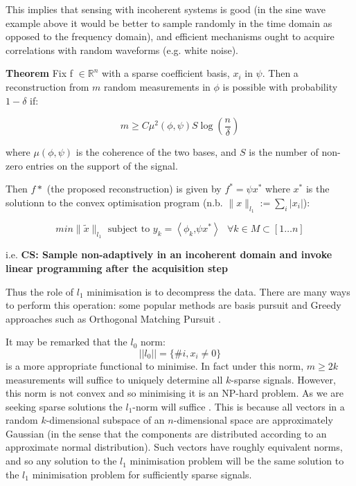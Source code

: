 \documentclass[12pt, a4paper]{article}
\newcommand{\vectornorm}[1]{\left|\left|#1\right|\right|}
\begin{document}
This implies that sensing with incoherent systems is good (in the sine wave example above it would be better to sample randomly in the time domain as opposed to the frequency domain), and efficient mechanisms ought to acquire correlations with random waveforms (e.g. white noise).

\textbf{Theorem} \cite{Candes2006}
Fix f \(\in \mathbb{R}^n\) with a sparse coefficient basis, \(x_{i}\) in \(\psi\). Then a reconstruction from \(m\) random measurements in \(\phi\) is possible with probability \(1 - \delta\) if: 

\begin{equation}
m \geq C \mu^2(\phi, \psi) S \log\left(\frac{n}{\delta}\right)
\end{equation}
\label{minsamples}

where \( \mu(\phi, \psi)\) is the coherence of the two bases, and \(S\) is the number of non-zero entries on the support of the signal.

Then \(f*\) (the proposed reconstruction) is given by \(f^* = \psi x^*\) where \(x^*\) is the solutionn to the convex optimisation program (n.b. \(\| x\|_{l_{1}} := \sum_{i} |x_{i}| \)):

\begin{equation}
min\|\tilde{x}\|_{l_{1}} \text{ subject to } y_{k} = \left\langle \phi_{k} \text{,} \psi x^* \right\rangle \text{   } \forall k \in M \subset [1 \ldots n]
\end{equation}
\label{program0}

i.e. \textbf{CS: Sample non-adaptively in an incoherent domain and invoke linear programming after the acquisition step}

Thus the role of \(l_{1}\) minimisation is to decompress the data. There are many ways to perform this operation: some popular methods are basis pursuit \cite{Chen1998} and Greedy approaches such as Orthogonal Matching Pursuit \cite{Tropp2007}. 

It may be remarked that the \(l_0\) norm:
%
\begin{equation}
\vectornorm{l_0} = \{\# i, x_i \neq 0\}
\end{equation}
%
is a more appropriate functional to minimise. In fact under this norm, \(m \geq 2k\) measurements will suffice to uniquely determine all \(k\)-sparse signals. However, this norm is not convex and so minimising it is an NP-hard problem. As we are seeking sparse solutions the \(l_1\)-norm will suffice \cite{Donoho2006a}. This is because all vectors in a random \(k\)-dimensional subspace of an \(n\)-dimensional space are approximately Gaussian (in the sense that the components are distributed according to an approximate normal distribution). Such vectors have roughly equivalent norms, and so any solution to the \(l_1\) minimisation problem will be the same solution to the \(l_1\) minimisation problem for sufficiently sparse signals.
\end{document}
